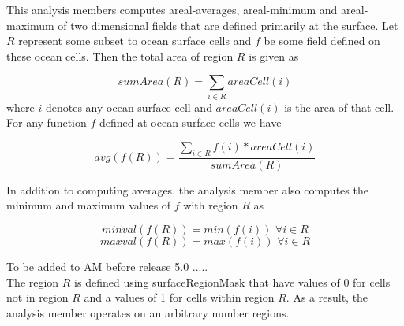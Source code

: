 This analysis members computes areal-averages, areal-minimum and areal-maximum of two dimensional fields that are defined primarily at the surface. Let $R$ represent some subset to ocean surface cells and $f$ be some field defined on these ocean cells. Then the total area of region $R$ is given as

\begin{equation}
sumArea(R) = \sum_{i \in R} areaCell(i)
\end{equation}
where $i$ denotes any ocean surface cell and $areaCell(i)$ is the area of that cell. For any function $f$ defined at ocean surface cells we have

\begin{equation}
avg(f(R)) = \frac{\sum_{i \in R} f(i)*areaCell(i)}{sumArea(R)}
\end{equation}

In addition to computing averages, the analysis member also computes the minimum and maximum values of $f$ with region $R$ as

\begin{equation}
minval(f(R))=min(f(i)) \, \, \forall i \in R
\end{equation}
\begin{equation}
maxval(f(R))=max(f(i)) \, \, \forall i \in R
\end{equation}

{\noindent}To be added to AM before release 5.0 .....\\
The region $R$ is defined using surfaceRegionMask that have values of 0 for cells not in region $R$ and a values of 1 for cells within region $R$. As a result, the analysis member operates on an arbitrary number regions.
